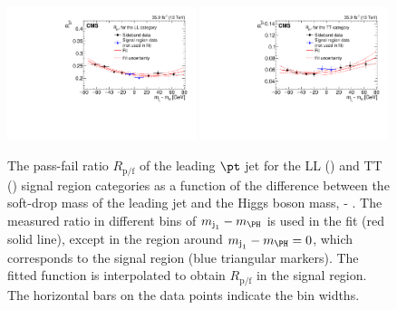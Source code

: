 \begin{figure}[htb]
\centering
\includegraphics[width=0.49\textwidth]{B2G-16-026/Figure_005-a.pdf}
\includegraphics[width=0.49\textwidth]{B2G-16-026/Figure_005-b.pdf}
\caption{The pass-fail ratio $R_\text{p/f}$ of the leading $\pt$ jet for the LL (\cmsLeft) and TT (\cmsRight) signal region categories as a function of the difference between the soft-drop mass of the leading jet and the Higgs boson mass, {\mjone - \mH}. The measured ratio in different bins of $\mjone - \mH$ is used in the fit (red solid line), except in the region around $\mjone - \mH = 0$, which corresponds to the signal region (blue triangular markers). The fitted function is interpolated to obtain $R_\text{p/f}$ in the signal region. The horizontal bars on the data points indicate the bin widths.}
\label{fig:Alphabet_Rpf_TT_LL}
\end{figure}

